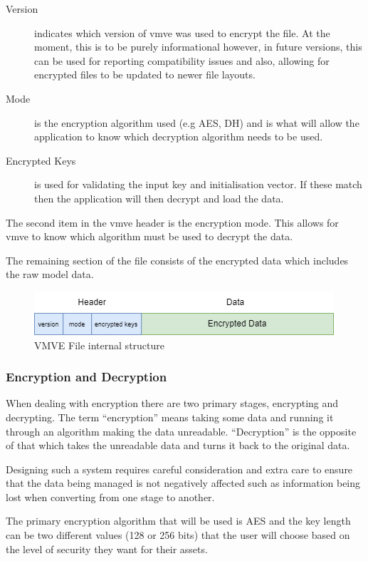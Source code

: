 \documentclass[11pt]{article}
\begin{document}
\begin{description}
  \item[Version] indicates which version of \gls*{vmve} was used to encrypt the
  file. At the moment, this is to be purely informational however, in future
  versions, this can be used for reporting compatibility issues and also,
  allowing for encrypted files to be updated to newer file layouts.
  \item[Mode] is the encryption algorithm used (e.g AES, DH) and is what will
  allow the application to know which decryption algorithm needs to be used.
  \item[Encrypted Keys] is used for validating the input key and initialisation
  vector. If these match then the application will then decrypt and load the data.
\end{description}

The second item in the \gls*{vmve} header is the encryption mode. This allows for
\gls*{vmve} to know which algorithm must be used to decrypt the data.

The remaining section of the file consists of the encrypted data which includes
the raw model data.

\begin{figure}[H]
  \centering
  \includegraphics[width=\textwidth]{images/vmve_file_structure.png}
  \caption{VMVE File internal structure}
  \label{fig:vmve_file_structure}
\end{figure}


\subsubsection{Encryption and Decryption}
When dealing with encryption there are two primary stages, encrypting and
decrypting. The term ``encryption'' means taking some data and running it
through an algorithm making the data unreadable. ``Decryption'' is the opposite
of that which takes the unreadable data and turns it back to the original data.

Designing such a system requires careful consideration and extra care to ensure
that the data being managed is not negatively affected such as information being
lost when converting from one stage to another.

The primary encryption algorithm that will be used is AES and the key length can
be two different values (128 or 256 bits) that the user will choose based on the
level of security they want for their assets.
\end{document}
